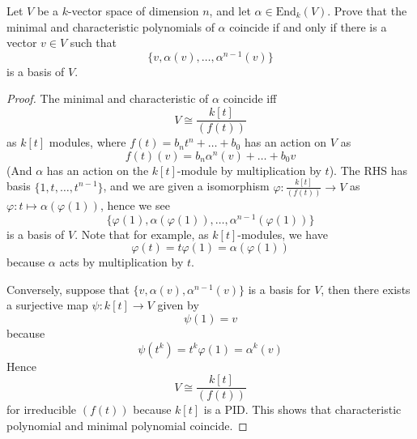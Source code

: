 \documentclass[openany]{book}
\begin{document}
\begin{prob}[7.7]
    Let \( V \) be a \( k \)-vector space of dimension \( n \), and let \( \alpha \in \text{End}_k(V) \). Prove that the minimal and characteristic polynomials of \( \alpha \) coincide if and only if there is a vector \( v \in V \) such that  
    \[ \{v, \alpha(v), \dots, \alpha^{n-1}(v)\} \] 
is a basis of \( V \).
\end{prob}
\begin{proof}
    The minimal and characteristic of $\alpha$ coincide iff 
    \begin{equation*}
        V\cong\frac{k[t]}{(f(t))}
    \end{equation*}
    as $k[t]$ modules, where $f(t)=b_nt^n+\dots+b_0$ has an action on $V$ as
    \begin{equation*}
        f(t)(v)=b_n\alpha^n(v)+\dots+b_0v
    \end{equation*} 
    (And $\alpha$ has an action on the $k[t]$-module by multiplication by $t$).
    The RHS has basis $\{1,t,\dots, t^{n-1}\}$,  and we are given a isomorphism $\varphi: \frac{k[t]}{(f(t))}\to V$ as  $\varphi: t\mapsto\alpha(\varphi(1))$, hence we see 
    \begin{equation*}
        \{\varphi(1),\alpha(\varphi(1)),\dots, \alpha^{n-1}(\varphi(1))\}
    \end{equation*}
    is a basis of $V$. Note that for example, as $k[t]$-modules, we have
    \begin{equation*}
        \varphi(t)=t\varphi(1)=\alpha(\varphi(1))
    \end{equation*}
    because $\alpha$ acts by multiplication by $t$.

    Conversely, suppose that $\{v,\alpha(v),\alpha^{n-1}(v)\}$ is a basis for $V$, then there exists a surjective map $\psi: k[t]\to V$ given by 
    \begin{equation*}
        \psi(1)=v
    \end{equation*}
    because 
    \begin{equation*}
        \psi(t^k)=t^k\varphi(1)=\alpha^{k}(v)
    \end{equation*}
    Hence 
    \begin{equation*}
        V\cong\frac{k[t]}{(f(t))}
    \end{equation*}
    for irreducible $(f(t))$ because $k[t]$ is a PID. This shows that characteristic polynomial and minimal polynomial coincide.
\end{proof}
\end{document}
